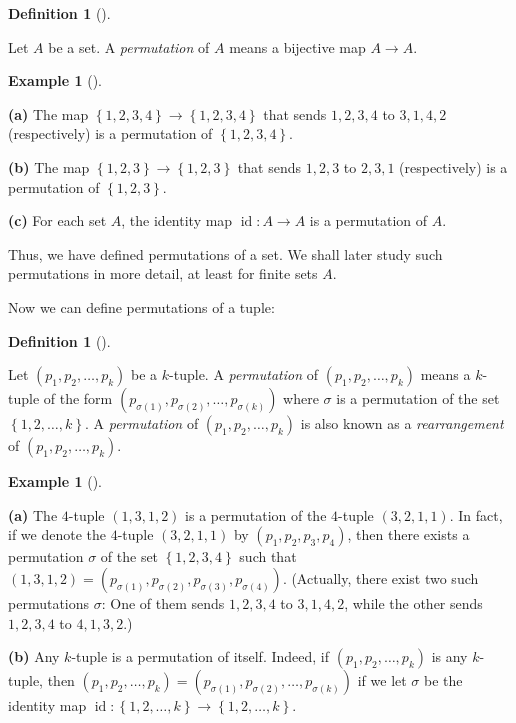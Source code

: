 \documentclass[numbers=enddot,12pt,final,onecolumn,notitlepage]{scrartcl}%
\numberwithin{exer}{subsection}
\theoremstyle{definition}
\newtheorem{defi}[theo]{Definition}
\newenvironment{definition}[1][]
{\begin{defi}[#1]\begin{leftbar}}
{\end{leftbar}\end{defi}}
\newtheorem{exam}[theo]{Example}
\newenvironment{example}[1][]
{\begin{exam}[#1]\begin{leftbar}}
{\end{leftbar}\end{exam}}
\begin{document}
\begin{definition}
Let $A$ be a set. A \textit{permutation} of $A$ means a bijective map
$A\rightarrow A$.
\end{definition}

\begin{example}
\textbf{(a)} The map $\left\{  1,2,3,4\right\}  \rightarrow\left\{
1,2,3,4\right\}  $ that sends $1,2,3,4$ to $3,1,4,2$ (respectively) is a
permutation of $\left\{  1,2,3,4\right\}  $.

\textbf{(b)} The map $\left\{  1,2,3\right\}  \rightarrow\left\{
1,2,3\right\}  $ that sends $1,2,3$ to $2,3,1$ (respectively) is a permutation
of $\left\{  1,2,3\right\}  $.

\textbf{(c)} For each set $A$, the identity map $\operatorname*{id}%
:A\rightarrow A$ is a permutation of $A$.
\end{example}

Thus, we have defined permutations of a set. We shall later study such
permutations in more detail, at least for finite sets $A$.

Now we can define permutations of a tuple:

\begin{definition}
Let $\left(  p_{1},p_{2},\ldots,p_{k}\right)  $ be a $k$-tuple. A
\textit{permutation} of $\left(  p_{1},p_{2},\ldots,p_{k}\right)  $ means a
$k$-tuple of the form $\left(  p_{\sigma\left(  1\right)  },p_{\sigma\left(
2\right)  },\ldots,p_{\sigma\left(  k\right)  }\right)  $ where $\sigma$ is a
permutation of the set $\left\{  1,2,\ldots,k\right\}  $. A
\textit{permutation} of $\left(  p_{1},p_{2},\ldots,p_{k}\right)  $ is also
known as a \textit{rearrangement} of $\left(  p_{1},p_{2},\ldots,p_{k}\right)
$.
\end{definition}

\begin{example}
\textbf{(a)} The $4$-tuple $\left(  1,3,1,2\right)  $ is a permutation of the
$4$-tuple $\left(  3,2,1,1\right)  $. In fact, if we denote the $4$-tuple
$\left(  3,2,1,1\right)  $ by $\left(  p_{1},p_{2},p_{3},p_{4}\right)  $, then
there exists a permutation $\sigma$ of the set $\left\{  1,2,3,4\right\}  $
such that $\left(  1,3,1,2\right)  =\left(  p_{\sigma\left(  1\right)
},p_{\sigma\left(  2\right)  },p_{\sigma\left(  3\right)  },p_{\sigma\left(
4\right)  }\right)  $. (Actually, there exist two such permutations $\sigma$:
One of them sends $1,2,3,4$ to $3,1,4,2$, while the other sends $1,2,3,4$ to
$4,1,3,2$.)

\textbf{(b)} Any $k$-tuple is a permutation of itself. Indeed, if $\left(
p_{1},p_{2},\ldots,p_{k}\right)  $ is any $k$-tuple, then $\left(  p_{1}%
,p_{2},\ldots,p_{k}\right)  =\left(  p_{\sigma\left(  1\right)  }%
,p_{\sigma\left(  2\right)  },\ldots,p_{\sigma\left(  k\right)  }\right)  $ if
we let $\sigma$ be the identity map $\operatorname*{id}:\left\{
1,2,\ldots,k\right\}  \rightarrow\left\{  1,2,\ldots,k\right\}  $.
\end{example}
\end{document}
